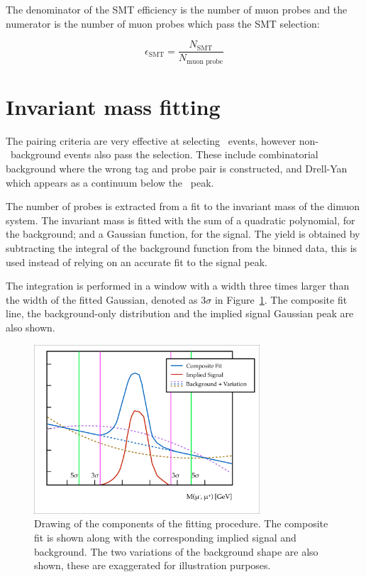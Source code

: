 The denominator of the SMT efficiency is the number of muon probes and the numerator is the number of muon probes which pass the SMT selection:

\begin{equation}
  \epsilon_{\textrm{SMT}} = \frac{N_{\textrm{SMT}}}{N_{\textrm{muon probe}}}
\end{equation}

\section{Invariant mass fitting}\label{sec:CalibrationFitting}

The pairing criteria are very effective at selecting \jpsi\ events, however non-\jpsi\ background events also pass the selection. These include combinatorial background where the wrong tag and probe pair is constructed, and Drell-Yan which appears as a continuum below the \jpsi\ peak.

The number of probes is extracted from a fit to the invariant mass of the dimuon system. The invariant mass is fitted with the sum of a quadratic polynomial, for the background; and a Gaussian function, for the signal. The yield is obtained by subtracting the integral of the background function from the binned data, this is used instead of relying on an accurate fit to the signal peak.

The integration is performed in a window with a width three times larger than the width of the fitted Gaussian, denoted as $3\sigma$ in Figure~\ref{fig:CalibrationFittingExample}. The composite fit line, the background-only distribution and the implied signal Gaussian peak are also shown.

\begin{figure}[htbp]
  \centering
    \includegraphics[width=0.75\textwidth]{PartCalibration2012/Plots/FittingExample.pdf}
    \caption[Drawing of the components of the fitting procedure.]{Drawing of the components of the fitting procedure. The composite fit is shown along with the corresponding implied signal and background. The two variations of the background shape are also shown, these are exaggerated for illustration purposes.}\label{fig:CalibrationFittingExample}
\end{figure}

